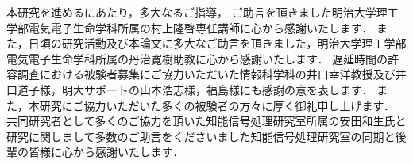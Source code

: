 \begin{acknowledgement}
本研究を進めるにあたり，多大なるご指導，
ご助言を頂きました明治大学理工学部電気電子生命学科所属の村上隆啓専任講師に心から感謝いたします．
また，日頃の研究活動及び本論文に多大なご助言を頂きました，明治大学理工学部電気電子生命学科所属の丹治寛樹助教に心から感謝いたします．
遅延時間の許容調査における被験者募集にご協力いただいた情報科学科の井口幸洋教授及び井口道子様，明大サポートの山本浩志様，福島様にも感謝の意を表します．
また，本研究にご協力いただいた多くの被験者の方々に厚く御礼申し上げます．
共同研究者として多くのご協力を頂いた知能信号処理研究室所属の安田和生氏と研究に関しまして多数のご助言をくださいました知能信号処理研究室の同期と後輩の皆様に心から感謝いたします．
\makesignature
\end{acknowledgement}
